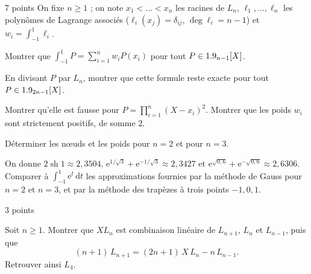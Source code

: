 \begin{exoEval}{7 points}{}
On fixe $n\geqslant1$ ; on note $x_1<\dots<x_n$ les racines de $L_n$,
$\ell_1,\dots,\ell_n$ les polynômes de Lagrange associés
($\ell_i(x_j)=\delta_{ij}$, $\deg\ell_i=n-1$) et $w_i=\int_{-1}^{1}\ell_i$.
\begin{questions}[start=7]
  \item Montrer que $\displaystyle\int_{-1}^{1}P=\sum_{i=1}^{n}w_iP(x_i)$ pour
    tout $P\in1.9_{n-1}[X]$.
  \item En divisant $P$ par $L_n$, montrer que cette formule reste exacte
    pour tout $P\in1.9_{2n-1}[X]$.
  \item Montrer qu'elle est fausse pour $P=\prod_{i=1}^{n}(X-x_i)^{2}$. Montrer
    que les poids $w_i$ sont strictement positifs, de somme $2$.
  \item Déterminer les nœuds et les poids pour $n=2$ et pour $n=3$.
  \item On donne $2\operatorname{sh}1\approx2{,}3504$,
    $\mathrm{e}^{1/\sqrt3}+\mathrm{e}^{-1/\sqrt3}\approx2{,}3427$ et
    $\mathrm{e}^{\sqrt{0{,}6}}+\mathrm{e}^{-\sqrt{0{,}6}}\approx2{,}6306$.
    Comparer à $\int_{-1}^{1}\mathrm{e}^{t}\,\mathrm{d}t$ les approximations
    fournies par la méthode de Gauss pour $n=2$ et $n=3$, et par la méthode
    des trapèzes à trois points $-1,0,1$.
\end{questions}
\end{exoEval}

\begin{exoEval}{3 points}{}
\begin{questions}[start=12]
  \item Soit $n\geqslant1$. Montrer que $XL_n$ est combinaison linéaire de
    $L_{n+1}$, $L_n$ et $L_{n-1}$, puis que
    \[(n+1)\,L_{n+1}=(2n+1)\,X\,L_n-n\,L_{n-1}.\]
    Retrouver ainsi $L_4$.
\end{questions}
\end{exoEval}
